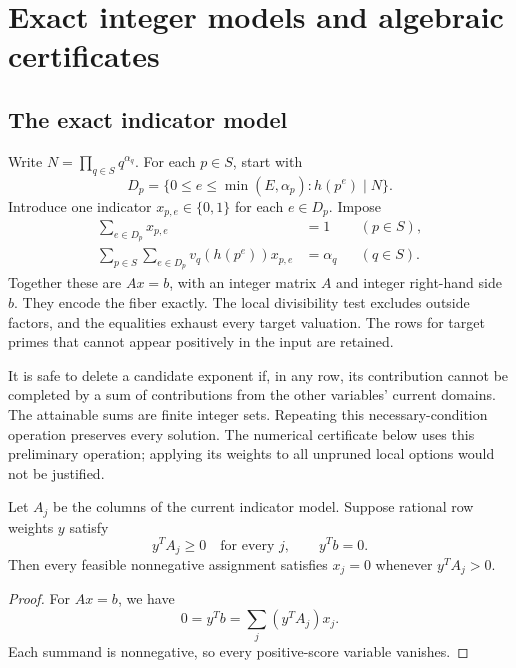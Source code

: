 \chapter{Exact integer models and algebraic certificates}\label{ch:integer}
\section{The exact indicator model}
Write $N=\prod_{q\in S}q^{\alpha_q}$. For each $p\in S$, start with
\[
 D_p=\{0\le e\le\min(E,\alpha_p):h(p^e)\mid N\}.
\]
Introduce one indicator $x_{p,e}\in\{0,1\}$ for each $e\in D_p$. Impose
\begin{align}
 \sum_{e\in D_p}x_{p,e}&=1 &&(p\in S),\label{integer:eq:onehot}\\
 \sum_{p\in S}\sum_{e\in D_p}v_q(h(p^e))x_{p,e}&=\alpha_q &&(q\in S).\label{integer:eq:valuation}
\end{align}
Together these are $Ax=b$, with an integer matrix $A$ and integer right-hand side $b$. They encode the fiber exactly. The local divisibility test excludes outside factors, and the equalities exhaust every target valuation. The rows for target primes that cannot appear positively in the input are retained.

It is safe to delete a candidate exponent if, in any row, its contribution cannot be completed by a sum of contributions from the other variables' current domains. The attainable sums are finite integer sets. Repeating this necessary-condition operation preserves every solution. The numerical certificate below uses this preliminary operation; applying its weights to all unpruned local options would not be justified.

\begin{lemma}\label{integer:lem:dual}
Let $A_j$ be the columns of the current indicator model. Suppose rational row weights $y$ satisfy
\[
 y^TA_j\ge0\quad\text{for every }j,\qquad y^Tb=0.
\]
Then every feasible nonnegative assignment satisfies $x_j=0$ whenever $y^TA_j>0$.
\end{lemma}
\begin{proof}
For $Ax=b$, we have
\[
 0=y^Tb=\sum_j(y^TA_j)x_j.
\]
Each summand is nonnegative, so every positive-score variable vanishes.
\end{proof}

